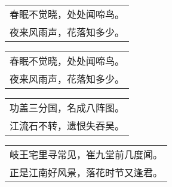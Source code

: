 \nopagebreak%
\nopagebreak%
\noindent\begin{minipage}{\linewidth}
  \vskip-3pt\begin{table}[H]
    \centering
    \begin{tabular}{@{}l@{}}
春眠不觉晓，处处闻啼鸟。\\
夜来风雨声，花落知多少。
    \end{tabular}
  \end{table}
\end{minipage}
\vspace{1cm}


\nopagebreak%
\nopagebreak%
\noindent\begin{minipage}{\linewidth}
  \vskip-3pt\begin{table}[H]
    \centering
    \begin{tabular}{@{}l@{}}
春眠不觉晓，处处闻啼鸟。\\
夜来风雨声，花落知多少。
    \end{tabular}
  \end{table}
\end{minipage}
\vspace{1cm}


\nopagebreak%
\nopagebreak%
\noindent\begin{minipage}{\linewidth}
  \vskip-3pt\begin{table}[H]
    \centering
    \begin{tabular}{@{}l@{}}
功盖三分国，名成八阵图。\\
江流石不转，遗恨失吞吴。
    \end{tabular}
  \end{table}
\end{minipage}
\vspace{1cm}


\nopagebreak%
\nopagebreak%
\noindent\begin{minipage}{\linewidth}
  \vskip-3pt\begin{table}[H]
    \centering
    \begin{tabular}{@{}l@{}}
岐王宅里寻常见，崔九堂前几度闻。\\
正是江南好风景，落花时节又逢君。
    \end{tabular}
  \end{table}
\end{minipage}
\vspace{1cm}


